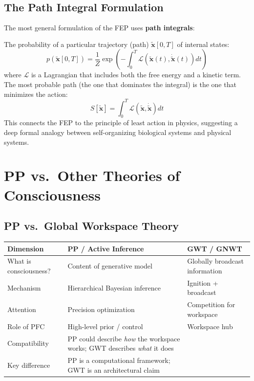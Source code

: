 \documentclass[11pt,a4paper]{report}
\begin{document}
\section{The Path Integral Formulation}

The most general formulation of the FEP uses \textbf{path integrals}:

\begin{mathbox}
\vspace{-6pt}
The probability of a particular trajectory (path) $\tilde{\mathbf{x}}[0, T]$ of internal states:
\[
  p\!\left(\tilde{\mathbf{x}}[0,T]\right) = \frac{1}{Z} \exp\!\left(-\int_0^T \mathcal{L}\!\left(\tilde{\mathbf{x}}(t), \dot{\tilde{\mathbf{x}}}(t)\right) dt\right)
\]
where $\mathcal{L}$ is a Lagrangian that includes both the free energy and a kinetic term. The most probable path (the one that dominates the integral) is the one that minimizes the action:
\[
  S[\tilde{\mathbf{x}}] = \int_0^T \mathcal{L}\!\left(\tilde{\mathbf{x}}, \dot{\tilde{\mathbf{x}}}\right) dt
\]
This connects the FEP to the principle of least action in physics, suggesting a deep formal analogy between self-organizing biological systems and physical systems.
\vspace{-4pt}
\end{mathbox}


\chapter{PP vs.\ Other Theories of Consciousness}

\section{PP vs.\ Global Workspace Theory}

\begin{compbox}
\renewcommand{\arraystretch}{1.4}
\begin{tabular}{>{\raggedright}p{3cm} >{\raggedright}p{5.2cm} >{\raggedright\arraybackslash}p{4.8cm}}
  \toprule
  \textbf{Dimension} & \textbf{PP / Active Inference} & \textbf{GWT / GNWT} \\
  \midrule
  What is consciousness? & Content of generative model & Globally broadcast information \\
  Mechanism & Hierarchical Bayesian inference & Ignition + broadcast \\
  Attention & Precision optimization & Competition for workspace \\
  Role of PFC & High-level prior / control & Workspace hub \\
  Compatibility & PP could describe \emph{how} the workspace works; GWT describes \emph{what} it does \\
  Key difference & PP is a computational framework; GWT is an architectural claim \\
  \bottomrule
\end{tabular}
\end{compbox}
\end{document}
